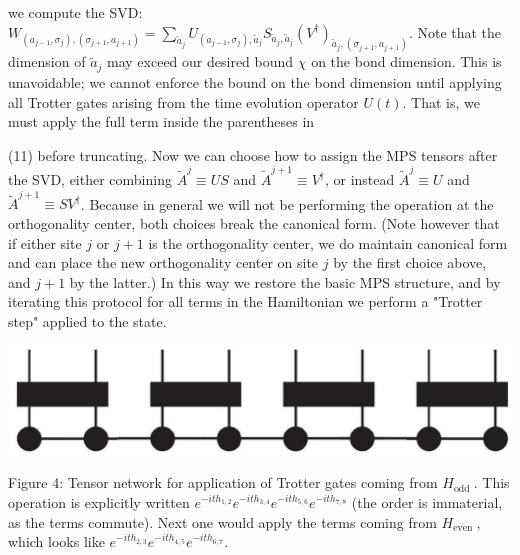 \documentclass[12pt]{article}
\begin{document}
we compute the SVD: $W_{\left(a_{j-1}, \sigma_{j}\right),\left(\sigma_{j+1}, a_{j+1}\right)}=\sum_{\tilde{a}_{j}} U_{\left(a_{j-1}, \sigma_{j}\right), \tilde{a}_{j}} S_{\tilde{a}_{j}, \tilde{a}_{j}}\left(V^{\dagger}\right)_{\tilde{a}_{j},\left(\sigma_{j+1}, a_{j+1}\right)}$. Note that the dimension of $\tilde{a}_{j}$ may exceed our desired bound $\chi$ on the bond dimension. This is unavoidable; we cannot enforce the bound on the bond dimension until applying all Trotter gates arising from the time evolution operator $U(t)$. That is, we must apply the full term inside the parentheses in

(11) before truncating. Now we can choose how to assign the MPS tensors after the SVD, either combining $\tilde{A}^{j} \equiv U S$ and $\tilde{A}^{j+1} \equiv V^{\dagger}$, or instead $\tilde{A}^{j} \equiv U$ and $\tilde{A}^{j+1} \equiv S V^{\dagger}$. Because in general we will not be performing the operation at the orthogonality center, both choices break the canonical form. (Note however that if either site $j$ or $j+1$ is the orthogonality center, we do maintain canonical form and can place the new orthogonality center on site $j$ by the first choice above, and $j+1$ by the latter.) In this way we restore the basic MPS structure, and by iterating this protocol for all terms in the Hamiltonian we perform a "Trotter step" applied to the state.

\begin{center}
\includegraphics[max width=\textwidth]{2024_05_17_c251ec82fd3768475949g-07}
\end{center}

Figure 4: Tensor network for application of Trotter gates coming from $H_{\text {odd }}$. This operation is explicitly written $e^{-i t h_{1,2}} e^{-i t h_{3,4}} e^{-i t h_{5,6}} e^{-i t h_{7,8}}$ (the order is immaterial, as the terms commute). Next one would apply the terms coming from $H_{\text {even }}$, which looks like $e^{-i t h_{2,3}} e^{-i t h_{4,5}} e^{-i t h_{6,7}}$.
\end{document}
